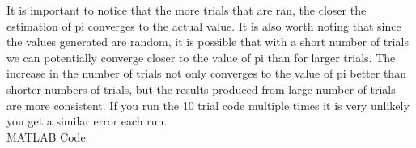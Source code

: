 \documentclass{article}
\begin{document}
It is important to notice that the more trials that are ran, the closer the estimation of pi converges to the actual value. It is also worth noting that since the values generated are random, it is possible that with a short number of trials we can potentially converge closer to the value of pi than for larger trials. The increase in the number of trials not only converges to the value of pi better than shorter numbers of trials, but the results produced from large number of trials are more consistent. If you run the 10 trial code multiple times it is very unlikely you get a similar error each run.\\
\newline
MATLAB Code:\\
\newline
\\
\newline

\end{document}
